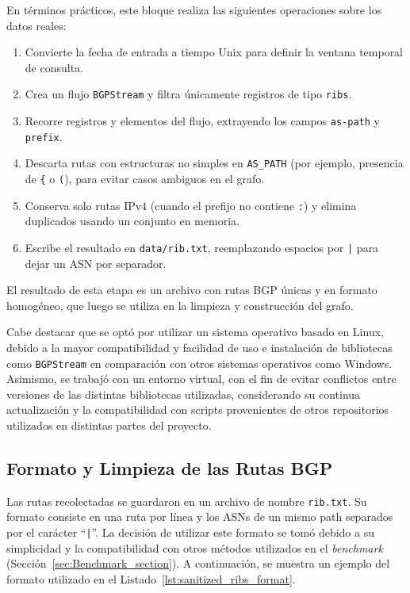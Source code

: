 

En términos prácticos, este bloque realiza las siguientes operaciones sobre los datos reales:
\begin{enumerate}
    \item Convierte la fecha de entrada a tiempo Unix para definir la ventana temporal de consulta.
    \item Crea un flujo \texttt{BGPStream} y filtra únicamente registros de tipo \texttt{ribs}.
    \item Recorre registros y elementos del flujo, extrayendo los campos \texttt{as-path} y \texttt{prefix}.
    \item Descarta rutas con estructuras no simples en \texttt{AS\_PATH} (por ejemplo, presencia de \texttt{\{} o \texttt{(}), para evitar casos ambiguos en el grafo.
    \item Conserva solo rutas IPv4 (cuando el prefijo no contiene \texttt{:}) y elimina duplicados usando un conjunto en memoria.
    \item Escribe el resultado en \texttt{data/rib.txt}, reemplazando espacios por \texttt{|} para dejar un ASN por separador.
\end{enumerate}

El resultado de esta etapa es un archivo con rutas BGP únicas y en formato homogéneo, que luego se utiliza en la limpieza y construcción del grafo.

Cabe destacar que se optó por utilizar un sistema operativo basado en Linux, 
debido a la mayor compatibilidad y facilidad de uso e instalación de 
bibliotecas como \texttt{BGPStream} en comparación con otros sistemas 
operativos como Windows. Asimismo, se trabajó con un entorno virtual, 
con el fin de evitar conflictos entre versiones de las distintas 
bibliotecas utilizadas, considerando su continua actualización y la 
compatibilidad con scripts provenientes de otros repositorios utilizados 
en distintas partes del proyecto.\\


\subsection{Formato y Limpieza de las Rutas BGP}

Las rutas recolectadas se guardaron en un archivo de nombre \texttt{rib.txt}. Su formato consiste en una ruta por línea y los ASNs de un mismo path separados por el carácter ``\texttt{|}''. La decisión de utilizar este formato se tomó debido a su simplicidad y la compatibilidad con otros métodos utilizados en el \textit{benchmark} (Sección~\ref{sec:Benchmark_section}). A continuación, se muestra un ejemplo del formato utilizado en el Listado~\ref{lst:sanitized_ribs_format}.\\

